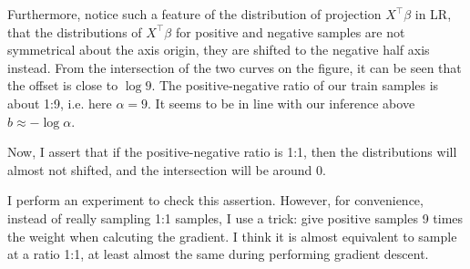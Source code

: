 \documentclass{article}
\begin{document}
Furthermore, notice such a feature of the distribution of projection $X^\top\beta$ in LR, that the distributions of $X^\top\beta$ for positive and negative samples are not symmetrical about the axis origin, 
they are shifted to the negative half axis instead. From the intersection of the two curves on the figure, it can be seen that the offset is close to $\log 9$. The positive-negative ratio of our train samples is about 1:9, i.e. here $\alpha = 9$. It seems to be in line with our inference above $b\approx -\log \alpha$.

Now, I assert that if the positive-negative ratio is 1:1, then the distributions will almost not shifted, and the intersection will be around 0.

I perform an experiment to check this assertion. However, for convenience, instead of really sampling 1:1 samples, I use a trick: give positive samples 9 times the weight when calcuting the gradient. I think it is almost equivalent to sample at a ratio 1:1, at least almost the same during performing gradient descent.
\end{document}
